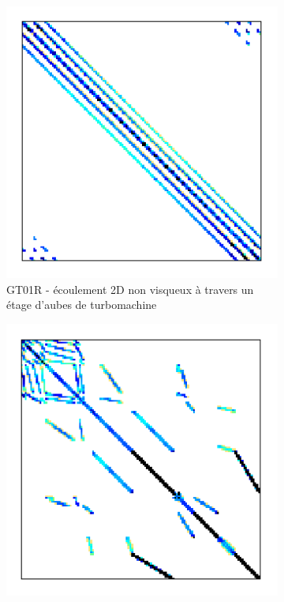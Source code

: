 	\begin{figure}
		\centering
		\begin{subfigure}[t]{0.3\textwidth}
			\centering
			\includegraphics[width=\textwidth]{images/GT01R.png}
			\caption{GT01R - écoulement 2D non visqueux à travers un étage d'aubes de turbomachine}
			\label{fig:sparse.GT01R}
		\end{subfigure}
		\hfill
		\begin{subfigure}[t]{0.3\textwidth}
			\centering
			\includegraphics[width=\textwidth]{images/HV15R.png}

\end{subfigure}
\end{figure}
